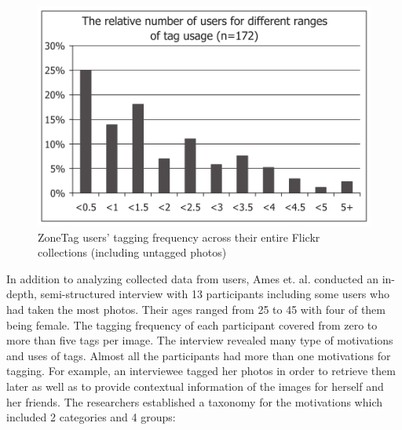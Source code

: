 \begin{figure}[!h]
\begin{centering}
\includegraphics[scale=0.7]{pics/zonetag.png}
\caption{ZoneTag users' tagging frequency across their entire Flickr collections (including untagged photos)}\label{fig:zonetag}
\end{centering}
\end{figure}

In addition to analyzing collected data from users, Ames et. al. conducted an in-depth, semi-structured interview with 13 participants including some users who had taken the most photos. Their ages ranged from 25 to 45 with four of them being female. The tagging frequency of each participant covered from zero to more than five tags per image. The interview revealed many type of motivations and uses of tags. Almost all the participants had more than one motivations for tagging. For example, an interviewee tagged her photos in order to retrieve them later as well as to provide contextual information of the images for herself and her friends. The researchers established a taxonomy for the motivations which included 2 categories and 4 groups:

